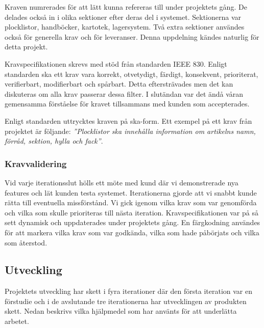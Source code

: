 \documentclass{article}
\begin{document}
Kraven numrerades för att lätt kunna refereras till under projektets gång. De delades också in i olika sektioner efter deras del i systemet. Sektionerna var plocklistor, handböcker, kartotek, lagersystem. Två extra sektioner användes också för generella krav och för leveranser. Denna uppdelning kändes naturlig för detta projekt. 

Kravspecifikationen skrevs med stöd från standarden IEEE 830. Enligt standarden ska ett krav vara korrekt, otvetydigt, färdigt, konsekvent, prioriterat, verifierbart, modifierbart och spårbart. Detta eftersträvades men det kan diskuteras om alla krav passerar dessa filter. I slutändan var det ändå våran gemensamma förståelse för kravet tillsammans med kunden som accepterades. 

Enligt standarden uttrycktes kraven på ska-form. Ett exempel på ett krav från projektet är följande: \textit{''Plocklistor ska innehålla information om artikelns namn, förråd, sektion, hylla och fack''}.

\subsubsection{Kravvalidering}
Vid varje iterationsslut hölls ett möte med kund där vi demonstrerade nya features och lät kunden testa systemet. Iterationerna gjorde att vi snabbt kunde rätta till eventuella missförstånd. Vi gick igenom vilka krav som var genomförda och vilka som skulle prioriteras till nästa iteration. Kravspecifikationen var på så sett dynamisk och uppdaterades under projektets gång. En färgkodning användes för att markera vilka krav som var godkända, vilka som hade påbörjats och vilka som återstod.

\subsection{Utveckling}
Projektets utveckling har skett i fyra iterationer där den första iteration var en förstudie och i de avslutande tre iterationerna har utvecklingen av produkten skett. Nedan beskrivs vilka hjälpmedel som har använts för att underlätta arbetet.
\end{document}
